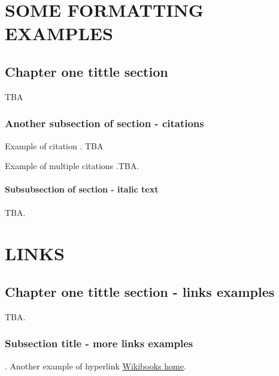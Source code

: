 \addchapheadtotoc
\chapter{SOME FORMATTING EXAMPLES}
\section{Chapter one tittle section}
TBA
\subsection{Another subsection of section - citations}
Example of citation \citep{altschul1997gapped}. TBA


Example of multiple citations \citep{altschul1997gapped,baker2007novel}.TBA.
\subsubsection{Subsubsection of section - italic text}
TBA.

\chapter{LINKS}
\section{Chapter one tittle section - links examples}
TBA.
\subsection{Subsection title - more links examples}.
Another example of hyperlink \href{http://www.wikibooks.org}{Wikibooks home}.
